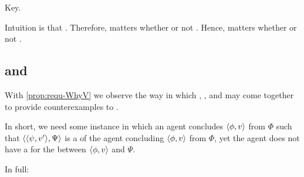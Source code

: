 \begin{note}
  Key.

  Intuition is that \tC{}.
  Therefore, matters whether or not \fc{}.
  Hence, matters whether or not \ros{}.
\end{note}

\subsection{ and \issueConstraint{}}
\label{cha:binding:sec:requ-iC}

\begin{note}
  With \autoref{prop:requ-WhyV} we observe the way in which , , and  may come together to provide counterexamples to \issueConstraint{}.

  In short, we need some instance in which an agent concludes \(\langle \phi, v \rangle\) from \(\Phi\) such that \(\langle \langle \psi, v' \rangle, \Psi \rangle\) is a \requ{} of the agent concluding \(\langle \phi, v \rangle\) from \(\Phi\), yet the agent does not have a \wit{} for the \ros{} between \(\langle \phi, v \rangle\) and \(\Psi\).

  In full:

  \begin{proposition}
    \label{prop:requ-WhyV-ces}


\end{proposition}
\end{note}
